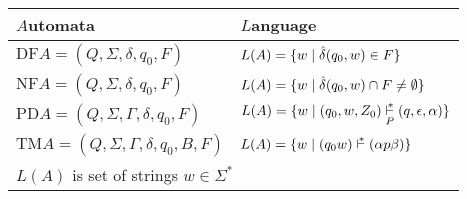 {\footnotesize
\begin{tabular}{l|l}
    $A$utomata & $L$anguage   \\
    \hline
  $\text{DF}A = (Q,\Sigma,\delta,q_{0},F)$
                   & $L(A) = \{w \;|\; \hat{\delta}(q_{0},w) \in F\}$ \\
  \(\text{NF}A = (Q,\Sigma,\delta,q_{0},F)\)
                   & $L(A) = \{w \;|\; \hat{\delta}(q_{0},w) \cap F \neq \emptyset\}$\\
  \(\text{PD}A = (Q,\Sigma,\Gamma,\delta,q_{0},F)\)
                   & $L(A) = \{w \gor (q_{0},w,Z_{0}) \underset{P}{\xvdash{*}} (q,\epsilon,\alpha)\}$\\
  \(\text{TM}A = (Q,\Sigma,\Gamma,\delta,q_{0},B,F)\)
                   & $L(A) = \{w \gor (q_{0}w)\xvdash{*} (\alpha p\beta)\}$\\
  \hline
  \multicolumn{2}{l}{$L(A)$ is set of strings $w \in \Sigma^{*}$}\\
  \hline
\end{tabular}
}

